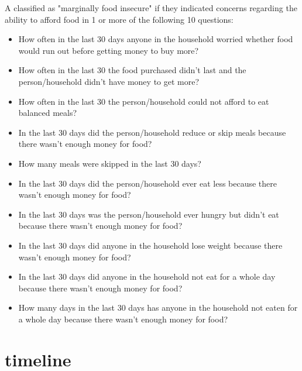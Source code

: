 \documentclass[t, hyperref={colorlinks=true}, compress]{beamer}
\begin{document}
\begin{frame}
\footnotesize A classified as "marginally food insecure" if they indicated concerns regarding the ability to afford food in 1 or more of the following 10 questions:

\begin{itemize}
\footnotesize
\item How often in the last 30 days anyone in the household worried whether food would run out before getting money to buy more? 
\item How often in the last 30 the food purchased didn’t last and the person/household didn’t have money to get more? 
\item	 How often in the last 30 the person/household could not afford to eat balanced meals?
\item In the last 30 days did the person/household reduce or skip meals because there wasn’t enough money for food?
\item How many meals were skipped in the last 30 days? 
\item In the last 30 days did the person/household ever eat less because there wasn’t enough money for food? 
\item	In the last 30 days was the person/household ever hungry but didn’t eat because there wasn’t enough money for food? 
\item	 In the last 30 days did anyone in the household lose weight because there wasn’t enough money for food?
\item In the last 30 days did anyone in the household not eat for a whole day because there wasn’t enough money for food?
\item	 How many days in the last 30 days has anyone in the household not eaten for a whole day because there wasn’t enough money for food?
\end{itemize}
\end{frame}

\section{timeline}
\end{document}

